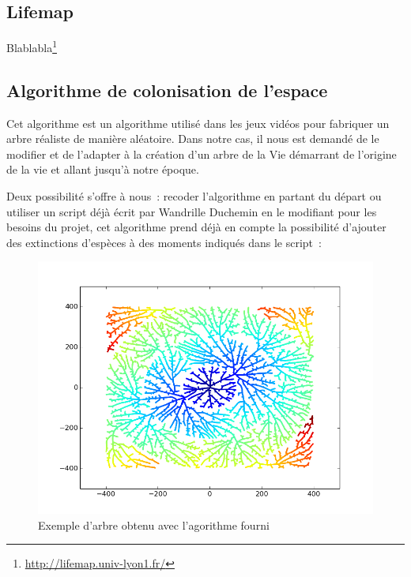 \documentclass[a4paper]{article}
\begin{document}
	\subsection{Lifemap}
		Blablabla\footnote{\url{http://lifemap.univ-lyon1.fr/}}

	\subsection{Algorithme de colonisation de l'espace}
		Cet algorithme est un algorithme utilisé dans les jeux vidéos pour fabriquer un arbre réaliste de manière aléatoire. Dans notre cas, il nous est demandé de le modifier et de l’adapter à la création d’un arbre de la Vie démarrant  de l’origine de la vie et allant jusqu’à notre époque.
	
		Deux possibilité s’offre à nous :  recoder l’algorithme en partant du départ ou utiliser un script déjà écrit par Wandrille Duchemin en le modifiant pour les besoins du projet, cet algorithme prend déjà en compte la possibilité d’ajouter des extinctions d’espèces à des moments indiqués dans le script :
		\begin{figure}[!h]
			\centering
			\includegraphics[width=12cm]{multipleExtinction.png}
			\caption{Exemple d'arbre obtenu avec l'agorithme fourni}
		\end{figure}
	
\end{document}
